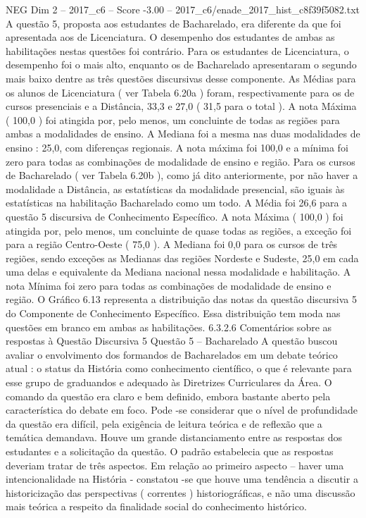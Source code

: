 \begin{textsample}{NEG Dim 2 – 2017\_c6 – Score -3.00 – 2017\_c6/enade\_2017\_hist\_c8f39f5082.txt}
A questão 5, proposta aos estudantes de Bacharelado, era diferente da que foi apresentada aos de Licenciatura.
O desempenho dos estudantes de ambas as habilitações nestas questões foi contrário.
Para os estudantes de Licenciatura, o desempenho foi o mais alto, enquanto os de Bacharelado apresentaram o segundo mais baixo dentre as três questões discursivas desse componente.
As Médias para os alunos de Licenciatura ( ver Tabela 6.20a ) foram, respectivamente para os de cursos presenciais e a Distância, 33,3 e 27,0 ( 31,5 para o total ).
A nota Máxima ( 100,0 ) foi atingida por, pelo menos, um concluinte de todas as regiões para ambas a modalidades de ensino.
A Mediana foi a mesma nas duas modalidades de ensino : 25,0, com diferenças regionais.
A nota máxima foi 100,0 e a mínima foi zero para todas as combinações de modalidade de ensino e região.
Para os cursos de Bacharelado ( ver Tabela 6.20b ), como já dito anteriormente, por não haver a modalidade a Distância, as estatísticas da modalidade presencial, são iguais às estatísticas na habilitação Bacharelado como um todo.
A Média foi 26,6 para a questão 5 discursiva de Conhecimento Específico.
A nota Máxima ( 100,0 ) foi atingida por, pelo menos, um concluinte de quase todas as regiões, a exceção foi para a região Centro-Oeste ( 75,0 ).
A Mediana foi 0,0 para os cursos de três regiões, sendo exceções as Medianas das regiões Nordeste e Sudeste, 25,0 em cada uma delas e equivalente da Mediana nacional nessa modalidade e habilitação.
A nota Mínima foi zero para todas as combinações de modalidade de ensino e região.
O Gráfico 6.13 representa a distribuição das notas da questão discursiva 5 do Componente de Conhecimento Específico.
Essa distribuição tem moda nas questões em branco em ambas as habilitações. 6.3.2.6 Comentários sobre as respostas à Questão Discursiva 5 Questão 5 – Bacharelado A questão buscou avaliar o envolvimento dos formandos de Bacharelados em um debate teórico atual : o status da História como conhecimento científico, o que é relevante para esse grupo de graduandos e adequado às Diretrizes Curriculares da Área.
O comando da questão era claro e bem definido, embora bastante aberto pela característica do debate em foco.
Pode -se considerar que o nível de profundidade da questão era difícil, pela exigência de leitura teórica e de reflexão que a temática demandava.
Houve um grande distanciamento entre as respostas dos estudantes e a solicitação da questão.
O padrão estabelecia que as respostas deveriam tratar de três aspectos.
Em relação ao primeiro aspecto – haver uma intencionalidade na História - constatou -se que houve uma tendência a discutir a historicização das perspectivas ( correntes ) historiográficas, e não uma discussão mais teórica a respeito da finalidade social do conhecimento histórico.

\end{textsample}
